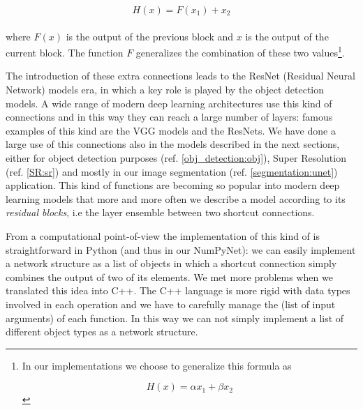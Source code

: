 \documentclass{standalone}
\begin{document}
$$
H(x) = F(x_1) + x_2
$$
\\
where $F(x)$ is the output of the previous block and $x$ is the output of the current block.
The function $F$ generalizes the combination of these two values\footnote{
  In our implementations we choose to generalize this formula as

  $$
  H(x) = \alpha x_1 + \beta x_2
  $$
}.

The introduction of these extra connections leads to the ResNet (Residual Neural Network) models era, in which a key role is played by the object detection models.
A wide range of modern deep learning architectures use this kind of connections and in this way they can reach a large number of layers: famous examples of this kind are the VGG models and the ResNets.
We have done a large use of this connections also in the models described in the next sections, either for object detection purposes (ref. \ref{obj_detection:obj}), Super Resolution (ref. \ref{SR:sr}) and mostly in our image segmentation (ref. \ref{segmentation:unet}) application.
This kind of functions are becoming so popular into modern deep learning models that more and more often we describe a model according to its \emph{residual blocks}, i.e the layer ensemble between two shortcut connections.

From a computational point-of-view the implementation of this kind of  is straightforward in \textsf{Python} (and thus in our \textsf{NumPyNet}): we can easily implement a network structure as a list of objects in which a shortcut connection simply combines the output of two of its elements.
We met more problems when we translated this idea into \textsf{C++}.
The \textsf{C++} language is more rigid with data types involved in each operation and we have to carefully manage the  (list of input arguments) of each function.
In this way we can not simply implement a list of different object types as a network structure.
\end{document}
